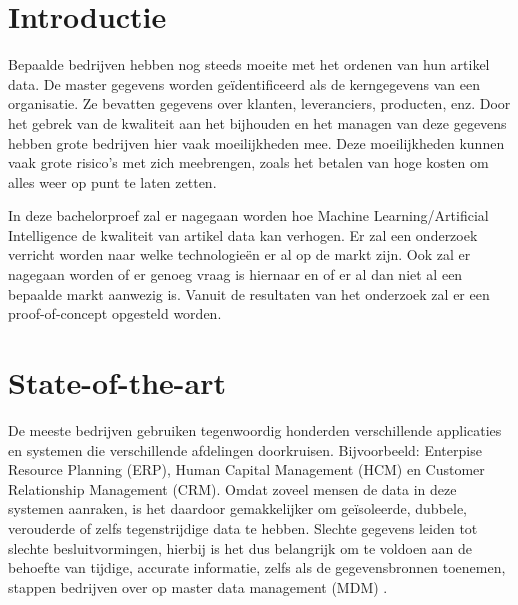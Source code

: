 
\section{Introductie}%
\label{sec:introductie}

Bepaalde bedrijven hebben nog steeds moeite met het ordenen van hun artikel data. De master gegevens worden geïdentificeerd als de kerngegevens van een organisatie. Ze bevatten gegevens over klanten, leveranciers, producten, enz. Door het gebrek van de kwaliteit aan het bijhouden en het managen van deze gegevens hebben grote bedrijven hier vaak moeilijkheden mee. Deze moeilijkheden kunnen vaak grote risico’s met zich meebrengen, zoals het betalen van hoge kosten om alles weer op punt te laten zetten. 

In deze bachelorproef zal er nagegaan worden hoe Machine Learning/Artificial Intelligence de kwaliteit van artikel data kan verhogen. Er zal een onderzoek verricht worden naar welke technologieën er al op de markt zijn. Ook zal er nagegaan worden of er genoeg vraag is hiernaar en of er al dan niet al een bepaalde markt aanwezig is. Vanuit de resultaten van het onderzoek zal er een proof-of-concept opgesteld worden.


\section{State-of-the-art}%
\label{sec:state-of-the-art}


De meeste bedrijven gebruiken tegenwoordig honderden verschillende applicaties en systemen die verschillende afdelingen doorkruisen. Bijvoorbeeld: Enterpise Resource Planning (ERP), Human Capital Management (HCM) en Customer Relationship Management (CRM). Omdat zoveel mensen de data in deze systemen aanraken, is het daardoor gemakkelijker om geïsoleerde, dubbele, verouderde of zelfs tegenstrijdige data te hebben. Slechte gegevens leiden tot slechte besluitvormingen, hierbij is het dus belangrijk om te voldoen aan de behoefte van tijdige, accurate informatie, zelfs als de gegevensbronnen toenemen, stappen bedrijven over op master data management (MDM) \autocite{SAP}.

